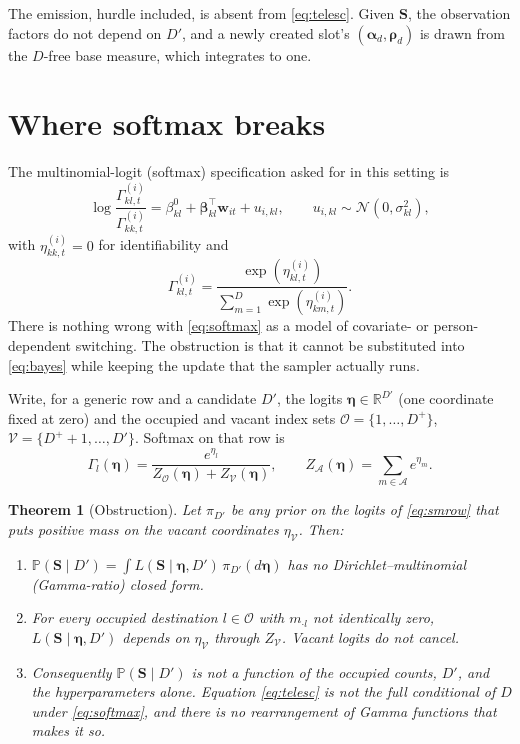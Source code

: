\documentclass[11pt,a4paper]{article}
\newcommand{\bs}{\boldsymbol}
\newcommand{\R}{\mathbb{R}}
\newcommand{\Prb}{\mathbb{P}}
\newcommand{\Dplus}{D^{+}}
\newcommand{\balpha}{\boldsymbol{\alpha}}
\newcommand{\brho}{\boldsymbol{\rho}}
\theoremstyle{plain}
\newtheorem{theorem}{Theorem}
\theoremstyle{definition}
\theoremstyle{remark}
\begin{document}
The emission, hurdle included, is absent from \eqref{eq:telesc}. Given
$\bs S$, the observation factors do not depend on $D'$, and a newly created
slot's $(\balpha_d,\brho_d)$ is drawn from the $D$-free base measure, which
integrates to one.

\section{Where softmax breaks}

The multinomial-logit (softmax) specification asked for in this setting is
\begin{equation}
\log\frac{\Gamma^{(i)}_{kl,t}}{\Gamma^{(i)}_{kk,t}}
=\beta^{0}_{kl}+\bs\beta_{kl}^{\top}\bs w_{it}+u_{i,kl},
\qquad
u_{i,kl}\sim\mathcal N(0,\sigma^{2}_{kl}),
\label{eq:softmax}
\end{equation}
with $\eta^{(i)}_{kk,t}=0$ for identifiability and
\begin{equation}
\Gamma^{(i)}_{kl,t}
=\frac{\exp(\eta^{(i)}_{kl,t})}{\sum_{m=1}^{D}\exp(\eta^{(i)}_{km,t})}.
\label{eq:smrow}
\end{equation}
There is nothing wrong with \eqref{eq:softmax} as a model of covariate- or
person-dependent switching. The obstruction is that it cannot be substituted
into \eqref{eq:bayes} while keeping the update that the sampler actually
runs.

Write, for a generic row and a candidate $D'$, the logits
$\bs\eta\in\R^{D'}$ (one coordinate fixed at zero) and the occupied and
vacant index sets $\mathcal O=\{1,\dots,\Dplus\}$,
$\mathcal V=\{\Dplus+1,\dots,D'\}$. Softmax on that row is
\begin{equation}
\Gamma_{l}(\bs\eta)
=\frac{e^{\eta_l}}{Z_{\mathcal O}(\bs\eta)+Z_{\mathcal V}(\bs\eta)},
\qquad
Z_{\mathcal A}(\bs\eta)=\sum_{m\in\mathcal A}e^{\eta_m}.
\label{eq:splitZ}
\end{equation}

\vspace{0.4em}
\begin{theorem}[Obstruction]
\label{thm:obstruct}
Let $\pi_{D'}$ be any prior on the logits of \eqref{eq:smrow} that puts
positive mass on the vacant coordinates $\eta_{\mathcal V}$. Then:
\begin{enumerate}
\item $\Prb(\bs S\mid D')=\displaystyle\int L(\bs S\mid\bs\eta,D')\,\pi_{D'}(d\bs\eta)$
has no Dirichlet--multinomial (Gamma-ratio) closed form.
\item For every occupied destination $l\in\mathcal O$ with $m_{\boldsymbol{\cdot}l}$
not identically zero, $L(\bs S\mid\bs\eta,D')$ depends on $\eta_{\mathcal V}$
through $Z_{\mathcal V}$. Vacant logits do not cancel.
\item Consequently $\Prb(\bs S\mid D')$ is not a function of the occupied
counts, $D'$, and the hyperparameters alone. Equation \eqref{eq:telesc} is
not the full conditional of $D$ under \eqref{eq:softmax}, and there is no
rearrangement of Gamma functions that makes it so.
\end{enumerate}
\end{theorem}
\end{document}
